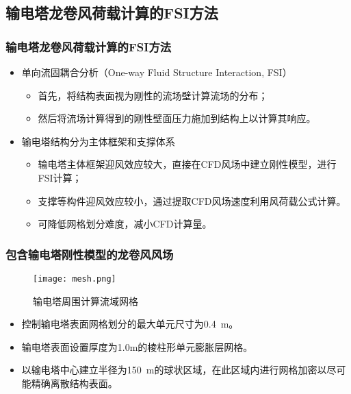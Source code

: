 \subsection{输电塔龙卷风荷载计算的FSI方法}

\begin{frame}
  \frametitle{输电塔龙卷风荷载计算的FSI方法}

  \begin{itemize}
  \item 
    单向流固耦合分析（One-way Fluid Structure Interaction, FSI）
    \begin{itemize}
    \item
      首先，将结构表面视为刚性的流场壁计算流场的分布；
    \item
      然后将流场计算得到的刚性壁面压力施加到结构上以计算其响应。
    \end{itemize}
    \bigskip
  \item
    输电塔结构分为主体框架和支撑体系
    \begin{itemize}
    \item
      输电塔主体框架迎风效应较大，直接在CFD风场中建立刚性模型，进行FSI计算；
    \item
      支撑等构件迎风效应较小，通过提取CFD风场速度利用风荷载公式计算。

    \bigskip
    \item
      可降低网格划分难度，减小CFD计算量。
    \end{itemize}
  \end{itemize}

\end{frame}

\begin{frame}
  \frametitle{包含输电塔刚性模型的龙卷风风场}
  \begin{figure}
    \centering
    \texttt{[image: mesh.png]}
    \caption*{输电塔周围计算流域网格}
  \end{figure}

  \begin{itemize}
  \item
    控制输电塔表面网格划分的最大单元尺寸为\SI{0.4}{m}。
  \item 
    输电塔表面设置厚度为1.0m的棱柱形单元膨胀层网格。
  \item
    以输电塔中心建立半径为\SI{150}{m}的球状区域，在此区域内进行网格加密以尽可能精确离散结构表面。
  \end{itemize}
\end{frame}

